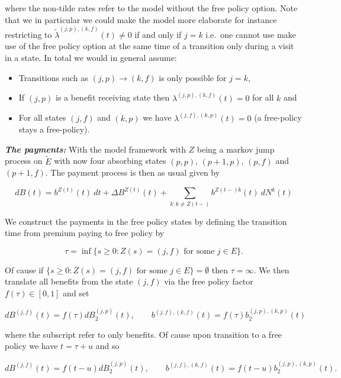 \documentclass[a4paper,12pt,openany]{book}
\providecommand{\tightlist}{%
 \setlength{\itemsep}{0pt}\setlength{\parskip}{0pt}}
\begin{document}
where the non-tilde rates refer to the model without the free policy option. Note that we in particular we could make the model more elaborate for instance restricting to \(\widetilde \lambda^{(j,p),(k,f)}(t)\ne 0\) if and only if \(j=k\) i.e.~one cannot use make use of the free policy option at the same time of a transition only during a visit in a state. In total we would in general assume:

\begin{itemize}
\tightlist
\item
  Transitions such as \((j,p)\to (k,f)\) is only possible for \(j=k\),
\item
  If \((j,p)\) is a benefit receiving state then \(\lambda^{(j,p),(k,f)}(t)=0\) for all \(k\) and
\item
  For all states \((j,f)\) and \((k,p)\) we have \(\lambda^{(j,f),(k,p)}(t)=0\) (a free-policy stays a free-policy).
\end{itemize}

\emph{\textbf{The payments:}} With the model framework with \(Z\) being a markov jump process on \(\widetilde E\) with now four absorbing states \((p,p)\), \((p+1,p)\), \((p,f)\) and \((p+1,f)\). The payment process is then as usual given by

\[
dB(t)=b^{Z(t)}(t)\ dt+\Delta B^{Z(t)}(t)+\sum_{k:k\ne Z(t-)}b^{Z(t-)k}(t)\ dN^k(t)
\]

We construct the payments in the free policy states by defining the transition time from premium paying to free policy by

\[
\tau=\inf\{s\ge 0:Z(s)=(j,f)\text{ for some }j\in E\}.
\]

Of cause if \(\{s\ge 0:Z(s)=(j,f)\text{ for some }j\in E\}=\emptyset\) then \(\tau =\infty\). We then translate all benefits from the state \((j,f)\) via the free policy factor \(f(\tau)\in[0,1]\) and set

\[
dB^{(j,f)}(t)=f(\tau)dB^{(j,p)}_2(t),\qquad b^{(j,f),(k,f)}(t)=f(\tau)b^{(j,p),(k,p)}_2(t)
\]

where the subscript refer to only benefits. Of cause upon transition to a free policy we have \(t=\tau + u\) and so

\[
dB^{(j,f)}(t)=f(t-u)dB^{(j,p)}_2(t),\qquad b^{(j,f),(k,f)}(t)=f(t-u)b^{(j,p),(k,p)}_2(t).
\]
\end{document}
